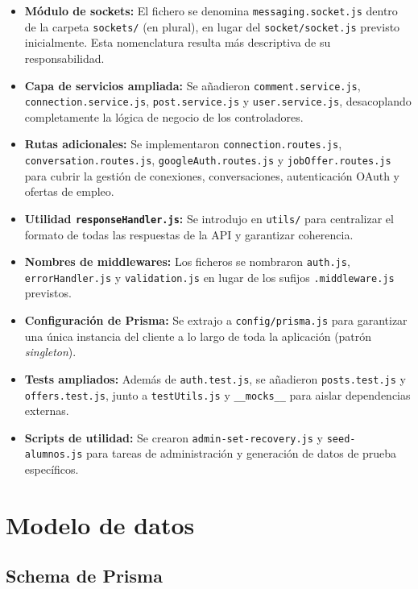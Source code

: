 \documentclass[a4paper]{report}
\begin{document}
\begin{itemize}
  \item \textbf{Módulo de sockets:} El fichero se denomina \texttt{messaging.socket.js} dentro de la carpeta \texttt{sockets/} (en plural), en lugar del \texttt{socket/socket.js} previsto inicialmente. Esta nomenclatura resulta más descriptiva de su responsabilidad.
  \item \textbf{Capa de servicios ampliada:} Se añadieron \texttt{comment.service.js}, \texttt{connection.service.js}, \texttt{post.service.js} y \texttt{user.service.js}, desacoplando completamente la lógica de negocio de los controladores.
  \item \textbf{Rutas adicionales:} Se implementaron \texttt{connection.routes.js}, \texttt{conversation.routes.js}, \texttt{googleAuth.routes.js} y \texttt{jobOffer.routes.js} para cubrir la gestión de conexiones, conversaciones, autenticación OAuth y ofertas de empleo.
  \item \textbf{Utilidad \texttt{responseHandler.js}:} Se introdujo en \texttt{utils/} para centralizar el formato de todas las respuestas de la API y garantizar coherencia.
  \item \textbf{Nombres de middlewares:} Los ficheros se nombraron \texttt{auth.js}, \texttt{errorHandler.js} y \texttt{validation.js} en lugar de los sufijos \texttt{.middleware.js} previstos.
  \item \textbf{Configuración de Prisma:} Se extrajo a \texttt{config/prisma.js} para garantizar una única instancia del cliente a lo largo de toda la aplicación (patrón \textit{singleton}).
  \item \textbf{Tests ampliados:} Además de \texttt{auth.test.js}, se añadieron \texttt{posts.test.js} y \texttt{offers.test.js}, junto a \texttt{testUtils.js} y \texttt{\_\_mocks\_\_} para aislar dependencias externas.
  \item \textbf{Scripts de utilidad:} Se crearon \texttt{admin-set-recovery.js} y \texttt{seed-alumnos.js} para tareas de administración y generación de datos de prueba específicos.
\end{itemize}

\section{Modelo de datos}

\subsection{Schema de Prisma}
\end{document}
